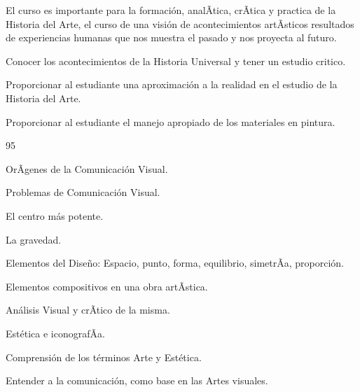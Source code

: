 \begin{syllabus}


\begin{justification}
El curso es importante para la formación, analÃ­tica, crÃ­tica y practica de la Historia del Arte, el curso de una visión de acontecimientos artÃ­sticos resultados de experiencias humanas que nos muestra el pasado y nos proyecta al futuro.
\end{justification}

\begin{goals}
\item Conocer los acontecimientos de la Historia Universal y tener un estudio critico.
\item Proporcionar al estudiante una aproximación a la realidad en el estudio de la Historia del Arte.
\item Proporcionar al estudiante el manejo apropiado de los materiales en pintura.
\end{goals}

\begin{outcomes}
\end{outcomes}

\begin{unit}{}{}{9}{5}
\begin{topics}
	\item OrÃ­genes de la Comunicación Visual.
	\item Problemas de Comunicación Visual.
	\item El centro más potente.
	\item La gravedad.
	\item Elementos del Diseño: Espacio, punto, forma, equilibrio, simetrÃ­a, proporción.
	\item Elementos compositivos en una obra artÃ­stica.
	\item Análisis Visual y crÃ­tico de la misma.
	\item Estética e iconografÃ­a.
\end{topics}
\begin{unitgoals}
	\item Comprensión de los términos Arte y Estética.
	\item Entender a la comunicación, como base en las Artes visuales.

\end{unitgoals}
\end{unit}


\end{syllabus}
